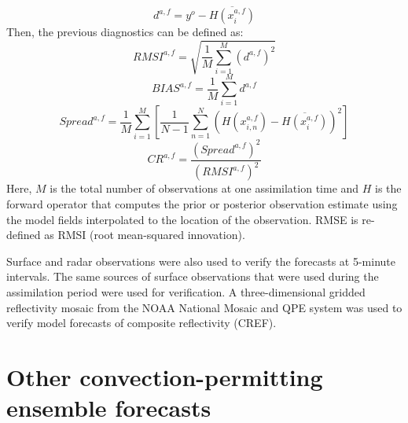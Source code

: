 \begin{equation}
   d^{a,f} = y^o - \overline{H(x_i^{a,f})}
\end{equation}
Then, the previous diagnostics can be defined as:
\begin{equation}
   RMSI^{a,f} = \sqrt{\frac{1}{M}\sum_{i=1}^{M} (d^{a,f})^2} 
\label{rmse}
\end{equation}
\begin{equation}
   BIAS^{a,f} = \frac{1}{M}\sum_{i=1}^{M} d^{a,f}
\label{bias}
\end{equation}
\begin{equation}
   Spread^{a,f} = \frac{1}{M}\sum_{i=1}^{M} [\frac{1}{N-1}\sum_{n=1}^{N}(H(x_{i,n}^{a,f}) - \overline{H(x_i^{a,f})})^2]
\end{equation}
\begin{equation}
   CR^{a,f} = \frac{(Spread^{a,f})^2}{(RMSI^{a,f})^2}
\label{cr}
\end{equation}
Here, \(M\) is the total number of observations at one assimilation time and \(H\) is the forward operator that computes the prior or posterior observation estimate using the model fields interpolated to the location of the observation. RMSE is re-defined as RMSI (root mean-squared innovation).

Surface and radar observations were also used to verify the forecasts at 5-minute intervals. The same sources of surface observations that were used during the assimilation period were used for verification. A three-dimensional gridded reflectivity mosaic from the NOAA National Mosaic and QPE system \citep{zhangetal11} was used to verify model forecasts of composite reflectivity (CREF).

\section{Other convection-permitting ensemble forecasts}
